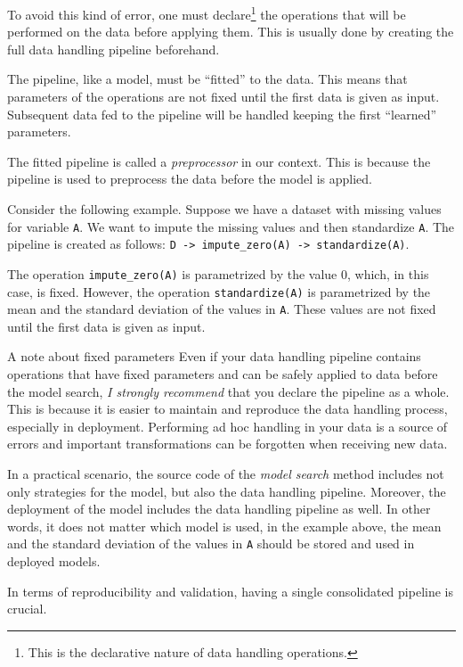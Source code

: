To avoid this kind of error, one must declare\footnote{This is the declarative nature of
data handling operations.} the operations that will be performed on the data before
applying them.  This is usually done by creating the full data handling pipeline
beforehand.

The pipeline, like a model, must be ``fitted'' to the data.  This means that parameters of
the operations are not fixed until the first data is given as input.  Subsequent data fed
to the pipeline will be handled keeping the first ``learned'' parameters.

The fitted pipeline is called a \emph{preprocessor} in our context.  This is because the
pipeline is used to preprocess the data before the model is applied.

Consider the following example.  Suppose we have a dataset with missing values for
variable \texttt{A}.  We want to impute the missing values and then standardize
\texttt{A}.  The pipeline is created as follows:  \texttt{D -> impute\_zero(A) ->
standardize(A)}.

The operation \texttt{impute\_zero(A)} is parametrized by the value 0, which, in this case,
is fixed.  However, the operation \texttt{standardize(A)} is parametrized by the mean and
the standard deviation of the values in \texttt{A}.  These values are not fixed until the
first data is given as input.

\begin{hlbox}{A note about fixed parameters}
  Even if your data handling pipeline contains operations that have fixed parameters and
  can be safely applied to data before the model search, \emph{I strongly recommend} that
  you declare the pipeline as a whole.  This is because it is easier to maintain and
  reproduce the data handling process, especially in deployment.  Performing ad hoc
  handling in your data is a source of errors and important transformations can be
  forgotten when receiving new data.
\end{hlbox}

In a practical scenario, the source code of the \emph{model search} method includes not
only strategies for the model, but also the data handling pipeline.  Moreover, the deployment
of the model includes the data handling pipeline as well.  In other words, it does not
matter which model is used, in the example above, the mean and the standard deviation of
the values in \texttt{A} should be stored and used in deployed models.

In terms of reproducibility and validation, having a single consolidated pipeline is
crucial.

